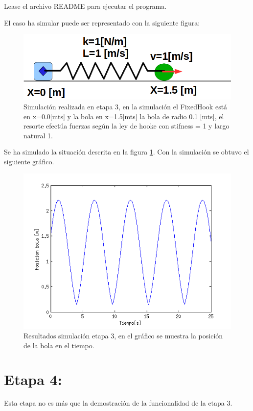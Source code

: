 \documentclass[a4paper,10pt]{article}
\begin{document}
  Lease el archivo README para ejecutar el programa.\newline
  
 El caso ha simular puede ser representado con la siguiente figura:
 
 \begin{figure}[H]
 \centering
 \includegraphics[scale=0.3]{./FigureC.png}
 \caption{Simulación realizada en etapa 3, en la simulación el FixedHook está en x=0.0[mts] y la bola en x=1.5[mts] 
 la bola de radio 0.1 [mts], el resorte efectúa fuerzas según la ley de hooke con stifness = 1 y largo natural 1.}
  \label{etapa3.1}
\end{figure}

  Se ha simulado la situación descrita en la figura \ref{etapa3.1}. Con la simulación se obtuvo el siguiente gráfico.

\begin{figure}[H]
 \centering
 \includegraphics[scale=0.5]{./simulacion_etapa3.png}
 \caption{Resultados simulación etapa 3, en el gráfico se muestra la posición de la bola en el tiempo.}
  \label{etapa3.2}
\end{figure}

\section{Etapa 4:}
  Esta etapa no es más que la demostración de la funcionalidad de la etapa 3.
  
\end{document}
